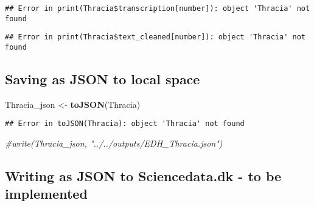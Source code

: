 \documentclass[]{article}
\newenvironment{Shaded}{\begin{snugshade}}{\end{snugshade}}
\newcommand{\CommentTok}[1]{\textcolor[rgb]{0.56,0.35,0.01}{\textit{#1}}}
\newcommand{\KeywordTok}[1]{\textcolor[rgb]{0.13,0.29,0.53}{\textbf{#1}}}
\newcommand{\NormalTok}[1]{#1}
\newcommand{\OperatorTok}[1]{\textcolor[rgb]{0.81,0.36,0.00}{\textbf{#1}}}
\newcommand{\StringTok}[1]{\textcolor[rgb]{0.31,0.60,0.02}{#1}}
\begin{document}
\begin{Shaded}
\end{Shaded}

\begin{verbatim}
## Error in print(Thracia$transcription[number]): object 'Thracia' not found
\end{verbatim}

\begin{Shaded}
\end{Shaded}

\begin{verbatim}
## Error in print(Thracia$text_cleaned[number]): object 'Thracia' not found
\end{verbatim}

\hypertarget{saving-as-json-to-local-space}{%
\subsection{Saving as JSON to local
space}\label{saving-as-json-to-local-space}}

\begin{Shaded}
\begin{Highlighting}[]
\NormalTok{Thracia_json <-}\StringTok{ }\KeywordTok{toJSON}\NormalTok{(Thracia)}
\end{Highlighting}
\end{Shaded}

\begin{verbatim}
## Error in toJSON(Thracia): object 'Thracia' not found
\end{verbatim}

\begin{Shaded}
\begin{Highlighting}[]
\CommentTok{#write(Thracia_json, "../../outputs/EDH_Thracia.json")}
\end{Highlighting}
\end{Shaded}

\hypertarget{writing-as-json-to-sciencedata.dk---to-be-implemented}{%
\subsection{Writing as JSON to Sciencedata.dk - to be
implemented}\label{writing-as-json-to-sciencedata.dk---to-be-implemented}}
\end{document}
